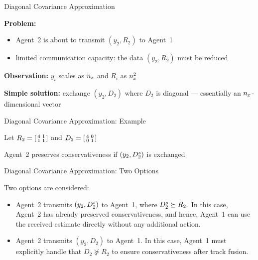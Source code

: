 \documentclass[aspectratio=1610]{beamer}
\begin{document}
\begin{frame}{Diagonal Covariance Approximation}

\textbf{Problem:}
\begin{itemize}
    \item Agent~2 is about to transmit $(y_2,R_2)$ to Agent~1
    \item limited communication capacity: the data $(y_2,R_2)$ must be reduced
\end{itemize}

\vspace{1em}

\textbf{Observation:} $y_i$ scales as $\nx$ and $R_i$ as $\nx^2$

\vspace{1em}

\textbf{Simple solution:} exchange $(y_2,D_2)$ where $D_2$ is diagonal --- essentially an $\nx$-dimensional vector

\end{frame}


\begin{frame}{Diagonal Covariance Approximation: Example}

Let $R_2=\BBSM4&1\\1&1\EBSM$ and $D_2=\BBSM4&0\\0&1\EBSM$

\begin{figure}
    \centering
    \begin{tikzpicture}
        
    \end{tikzpicture}
\end{figure}

\pause
\vspace{1em}

Agent~2 preserves conservativeness if $(y_2,\Ds_2)$ is exchanged

\end{frame}


\begin{frame}{Diagonal Covariance Approximation: Two Options}

Two options are considered:
\begin{itemize}
	\item Agent~2 transmits $(y_2,\Ds_2)$ to Agent~1, where $\Ds_2\succeq R_2$. In this case, Agent~2 has already preserved conservativeness, and hence, Agent~1 can use the received estimate directly without any additional action.
	\item Agent~2 transmits $(y_2,D_2)$ to Agent~1. In this case, Agent~1 must explicitly handle that $D_2\not\succeq R_2$ to ensure conservativeness after track fusion.
\end{itemize}

\end{frame}
\end{document}
